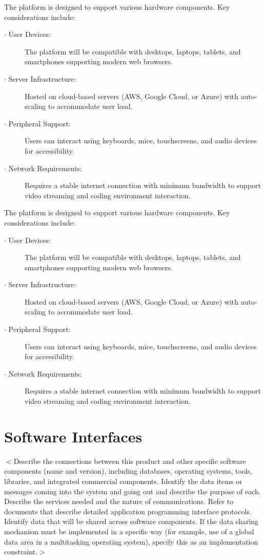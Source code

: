 \documentclass[a4paper, 11pt]{scrreprt}
\begin{document}
The platform is designed to support various hardware components. Key considerations include:
\begin{description}
    \item[$\cdot$ User Devices:] The platform will be compatible with desktops, laptops, tablets, and smartphones supporting modern web browsers.
    \item[$\cdot$ Server Infrastructure:] Hosted on cloud-based servers (AWS, Google Cloud, or Azure) with auto-scaling to accommodate user load.
    \item[$\cdot$ Peripheral Support:] Users can interact using keyboards, mice, touchscreens, and audio devices for accessibility.
    \item[$\cdot$ Network Requirements:] Requires a stable internet connection with minimum bandwidth to support video streaming and coding environment interaction.
\end{description}

The platform is designed to support various hardware components. Key considerations include:
\begin{description}
    \item[$\cdot$ User Devices:] The platform will be compatible with desktops, laptops, tablets, and smartphones supporting modern web browsers.
    \item[$\cdot$ Server Infrastructure:] Hosted on cloud-based servers (AWS, Google Cloud, or Azure) with auto-scaling to accommodate user load.
    \item[$\cdot$ Peripheral Support:] Users can interact using keyboards, mice, touchscreens, and audio devices for accessibility.
    \item[$\cdot$ Network Requirements:] Requires a stable internet connection with minimum bandwidth to support video streaming and coding environment interaction.
\end{description}

\section{Software Interfaces}
$<$Describe the connections between this product and other specific software 
components (name and version), including databases, operating systems, tools, 
libraries, and integrated commercial components. Identify the data items or 
messages coming into the system and going out and describe the purpose of each.  
Describe the services needed and the nature of communications. Refer to 
documents that describe detailed application programming interface protocols.  
Identify data that will be shared across software components. If the data 
sharing mechanism must be implemented in a specific way (for example, use of a 
global data area in a multitasking operating system), specify this as an 
implementation constraint.$>$
\end{document}
